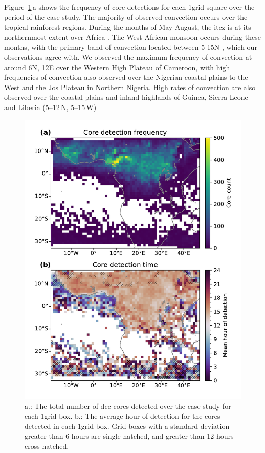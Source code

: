 \documentclass[acp, manuscript]{copernicus}
\begin{document}
Figure~\ref{fig:seviri_map_dists}\,a shows the frequency of core detections for each 1\textdegree grid square over the period of the case study. 
The majority of observed convection occurs over the tropical rainforest regions. 
During the months of May-August, the \acrfull{itcz} is at its northernmost extent over Africa \citep{nicholson_itcz_2018}. 
The West African monsoon occurs during these months, with the primary band of convection located between 5-15\textdegree N \citep{nicholson_revised_2009}, which our observations agree with. 
We observed the maximum frequency of convection at around 6\textdegree N, 12\textdegree E over the Western High Plateau of Cameroon, with high frequencies of convection also observed over the Nigerian coastal plains to the West and the Jos Plateau in Northern Nigeria. 
High rates of convection are also observed over the coastal plains and inland highlands of Guinea, Sierra Leone and Liberia (5--12\,\textdegree N, 5--15\,\textdegree W)


\begin{figure}[tp]
    \includegraphics[width=12cm]{figures/fig05.pdf}
    \caption[
    Number of detected cores and average hour of core detection
    ]{
    a.: The total number of \acrshort{dcc} cores detected over the case study for each 1\textdegree grid box. b.: The average hour of detection for the cores detected in each 1\textdegree grid box. Grid boxes with a standard deviation greater than 6 hours are single-hatched, and greater than 12 hours cross-hatched.
    }
    \label{fig:seviri_map_dists}
\end{figure}
\end{document}
